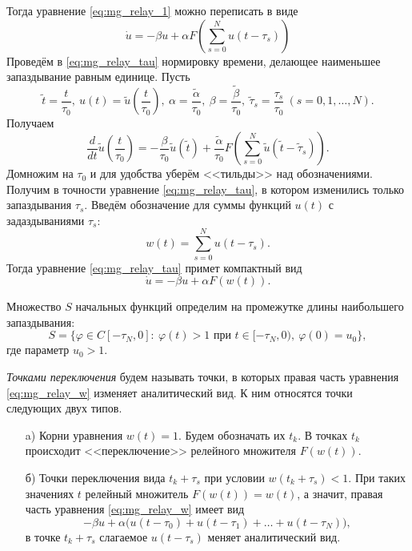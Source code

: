 Тогда уравнение \eqref{eq:mg_relay_1} можно переписать в виде
\begin{equation}
	\label{eq:mg_relay_tau}
	\dot{u}=-\beta u+\alpha F\left(\sum_{s=0}^{N}u(t-\tau_s)\right)
\end{equation}
%
Проведём в \eqref{eq:mg_relay_tau} нормировку времени, делающее наименьшее запаздывание равным единице. Пусть
%
\begin{equation*}
	\tilde{t} = \frac{t}{\tau_0}, \ u(t) = \tilde{u}\left(\frac{t}{\tau_0}\right), \ \alpha = \frac{\tilde{\alpha}}{\tau_0}, \ \beta = \frac{\tilde{\beta}}{\tau_0}, \ \tilde{\tau}_s = \frac{\tau_s}{\tau_0} \ (s = 0, 1, \ldots, N).
\end{equation*}
%
Получаем
%
\begin{equation*}
	\frac{d}{dt} \tilde{u}\left(\frac{t}{\tau_0}\right) = -\frac{\beta}{\tau_0} \tilde{u}(\tilde{t}) + \frac{\tilde{\alpha}}{\tau_0} F \left(\sum_{s=0}^{N}\tilde{u}(\tilde{t}-\tilde{\tau}_s)\right).
\end{equation*}
%
Домножим на $\tau_0$ и для удобства уберём <<тильды>> над обозначениями. Получим в точности уравнение \eqref{eq:mg_relay_tau}, в котором изменились только запаздывания $\tau_s$.
%
Введём обозначение для суммы функций $u(t)$ с задаздываниями $\tau_s$:
%
\begin{equation*}
	w(t) = \sum\limits_{s = 0}^N u(t - \tau_s).
\end{equation*}
%
Тогда уравнение \eqref{eq:mg_relay_tau} примет компактный вид
%
\begin{equation}
	\label{eq:mg_relay_w}
	\dot{u}=-\beta u + \alpha F(w(t)).
\end{equation}

Множество $S$ начальных функций определим на промежутке длины наибольшего запаздывания: 
%
\begin{equation}
	\label{eq:mg_init_set}
	S = \{\varphi\in C[-\tau_{N},0]:\  \varphi(t)>1 \text{ при } t\in[-\tau_{N},0),\ \varphi(0)=u_0\},
\end{equation}
%
где параметр $u_0 > 1$.

\emph{Точками переключения} будем называть точки, в которых правая часть уравнения \eqref{eq:mg_relay_w} изменяет аналитический вид. К ним относятся точки следующих двух типов.
\begin{enumerate}
	\item[a)] Корни уравнения $w(t) = 1$. Будем обозначать их $t_k$.
	В точках $t_k$ происходит <<переключение>> релейного множителя $F(w(t))$.
	\item[б)] Точки переключения вида $t_k + \tau_s$ при условии $w(t_k + \tau_s) < 1$. При таких значениях $t$ релейный множитель $F(w(t)) = w(t)$, а значит, правая часть уравнения \eqref{eq:mg_relay_w} имеет вид
	\begin{equation*}
		-\beta u+\alpha \big(u(t-\tau_0)+u(t-\tau_1)+\ldots+u(t-\tau_{N})\big),
	\end{equation*}
	в точке $t_k + \tau_s$ слагаемое $u(t - \tau_s)$ меняет аналитический вид.
\end{enumerate}

